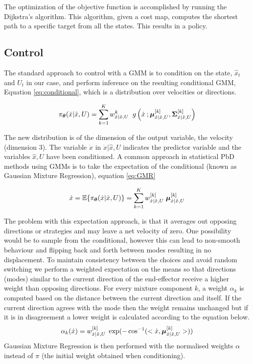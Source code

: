 The optimization of the objective function is accomplished by running the Dijkstra's algorithm. This algorithm, given a cost map, 
computes the shortest path to a specific target from all the states. This results in a policy.

\subsection{Control}
The standard approach to control with a GMM is to condition on the state,
$\hat{x}_t$ and $U_t$ in our case, and perform inference on the resulting conditional
GMM, Equation \ref{eq:conditional}, which is a distribution over velocities or directions.

\begin{equation} \label{eq:conditional}
  \pi_{\boldsymbol{\theta}}(\dot{x}|\hat{x},U) = \sum\limits_{k=1}^{K} w^{k}_{\dot{x}|\hat{x},U} \;\;  g\left(\dot{x}\: ;  \boldsymbol{\mu}^{[k]}_{\dot{x}|\hat{x},U}, \boldsymbol{\Sigma}^{[k]}_{\dot{x}|\hat{x},U} \right)
\end{equation}

The new distribution is of the dimension of the output variable, the velocity (dimension 3). 
The variable $\dot{x}$ in $\dot{x}|\hat{x},U$ indicates the predictor variable and the variables $\hat{x},U$ have been conditioned.
A common approach in statistical PbD methods using GMMs is to take the expectation of the conditional (known as Gaussian Mixture Regression), equation \ref{eq:GMR}

\begin{equation} \label{eq:GMR}
 \dot{x} = \mathbb{E}\{\pi_{\boldsymbol{\theta}}(\dot{x}|\hat{x},U)\} = \sum\limits_{k=1}^{K}  w^{[k]}_{\dot{x}|\hat{x},U} \; \boldsymbol{\mu}^{[k]}_{\dot{x}|\hat{x},U}
\end{equation}

The problem with this expectation approach, is that it averages out opposing directions or strategies and may leave 
a net velocity of zero. One possibility would be to sample from the conditional, however this can lead to non-smooth 
behaviour and flipping back and forth between modes resulting in no displacement. To maintain consistency between the
choices and avoid random switching  we perform a weighted expectation on the means so that 
directions (modes) similar to the current direction of the end-effector receive
a higher weight than opposing directions. For every mixture component $k$, a weight $\alpha_k$ is computed based 
on the distance between the current direction and itself.
If the current direction agrees with the mode then the weight remains unchanged but if it is in
disagreement a lower weight is
calculated according to the equation below. 
\begin{equation}  \label{eq:weight}
  \alpha_{k}(\dot{x}) = w^{[k]}_{\dot{x}|\hat{x},U} \; \exp(-\cos^{-1}(<\dot{x},\boldsymbol{\mu}^{[k]}_{\dot{x}|\hat{x},U}>))
\end{equation}
Gaussian Mixture Regression is then performed with the normalised  weights $\alpha$ instead of $\pi$
(the initial weight obtained when conditioning).

